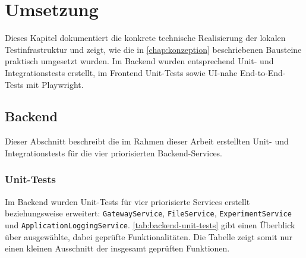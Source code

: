 
\chapter{Umsetzung}
\label{chap:umsetzung}
Dieses Kapitel dokumentiert die konkrete technische Realisierung der lokalen Testinfrastruktur und zeigt, wie die in \autoref{chap:konzeption} beschriebenen Bausteine praktisch umgesetzt wurden. Im Backend wurden entsprechend Unit- und Integrationstests erstellt, im Frontend Unit-Tests sowie UI-nahe End-to-End-Tests mit Playwright.

\section{Backend}
Dieser Abschnitt beschreibt die im Rahmen dieser Arbeit erstellten Unit- und Integrationstests für die vier priorisierten Backend-Services.


\subsection{Unit-Tests}
Im Backend wurden Unit-Tests für vier priorisierte Services erstellt beziehungsweise erweitert: \texttt{GatewayService}, \texttt{FileService}, \texttt{ExperimentService} und \texttt{ApplicationLoggingService}. \autoref{tab:backend-unit-tests} gibt einen Überblick über ausgewählte, dabei geprüfte Funktionalitäten. Die Tabelle zeigt somit nur einen kleinen Ausschnitt der insgesamt geprüften Funktionen.


